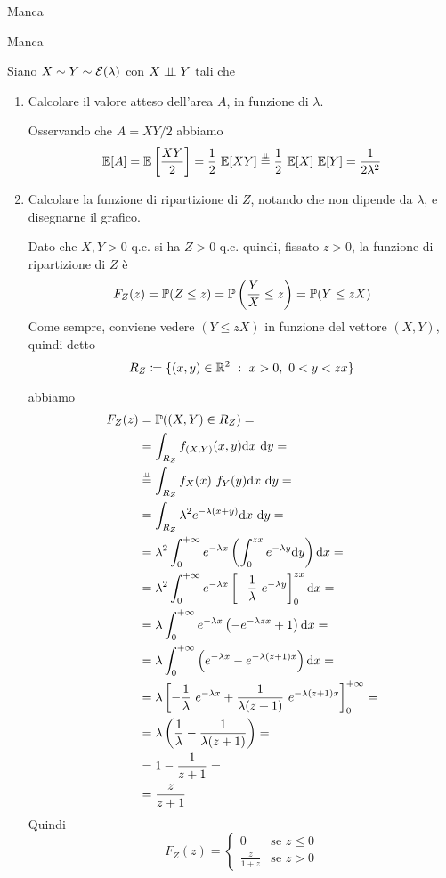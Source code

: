 \Soluzione{}
Manca

\Soluzione{}
Manca

\Soluzione{}
Siano $X\sim Y\sim\mathcal{E}(\lambda)$ con $X\perp \!\!\! \perp Y$ tali che


\begin{enumerate}
\item Calcolare il valore atteso dell'area $A$, in funzione di $\lambda$.

Osservando che $A=XY/2$ abbiamo
\[
\EE[A]=\EE\left[ \frac{XY}{2} \right]=\frac{1}{2}\ \EE[XY]\overset{\underset{\indep}{}}{=}\frac{1}{2}\ \EE[X]\ \EE[Y]=\frac{1}{2\lambda^2}
\]

\item Calcolare la funzione di ripartizione di $Z$, notando che non dipende da $\lambda$, e disegnarne il grafico.

Dato che $X,Y>0$ q.c. si ha $Z>0$ q.c. quindi, fissato $z>0$, la funzione di ripartizione di $Z$ è
\[
F_Z(z)=\mathbb{P}(Z\leq z)=\mathbb{P}\left(\frac{Y}{X}\leq z \right)=\mathbb{P}(Y\leq zX)
\] 
Come sempre, conviene vedere $(Y\leq zX)$ in funzione del vettore $(X,Y)$, quindi detto
\[
R_Z\coloneqq\{(x,y)\in\RR^2\ :\ x>0,\ 0<y<zx\}
\]


abbiamo 
\begin{gather*}
\begin{aligned}
F_Z(z)&=\mathbb{P}((X,Y)\in R_Z)= \\
&=\int_{R_Z}f_{(X,Y)}(x,y)\mathrm{d} x\ \mathrm{d} y= \\
&\overset{\underset{\perp \!\!\! \perp}{}}{=}\int_{R_Z}f_X(x)\ f_Y(y)\mathrm{d} x\ \mathrm{d} y=\\
&=\int_{R_Z}\lambda^2e^{-\lambda(x+y)}\mathrm{d} x\ \mathrm{d} y=\\
&=\lambda^2\int_{0}^{+\infty} e^{-\lambda x} \left( \int_0^{zx}e^{-\lambda y}\mathrm{d} y  \right)\mathrm{d} x=\\
&=\lambda^2\int_{0}^{+\infty} e^{-\lambda x} \left[-\frac{1}{\lambda}\ e^{-\lambda y}  \right]_0^{zx}\mathrm{d} x=\\
&=\lambda\int_{0}^{+\infty} e^{-\lambda x} \left( -e^{-\lambda zx}+1  \right)\mathrm{d} x=\\
&=\lambda\int_{0}^{+\infty} \left(e^{-\lambda x} -e^{-\lambda (z+1)x}  \right)\mathrm{d} x=\\
&=\lambda\left[-\frac{1}{\lambda}\ e^{-\lambda x}+\frac{1}{\lambda(z+1)}\ e^{-\lambda (z+1)x}  \right]_0^{+\infty}=\\
&=\lambda\left(\frac{1}{\lambda}-\frac{1}{\lambda(z+1)} \right)=\\
&=1-\frac{1}{z+1}=\\
&=\frac{z}{z+1}
\end{aligned}
\end{gather*}
Quindi
\[
F_Z(z)=
\begin{cases}
0 &\text{se }z\leq 0 \\
\displaystyle\frac{z}{1+z} &\text{se }z>0
\end{cases}
\]


\end{enumerate}
